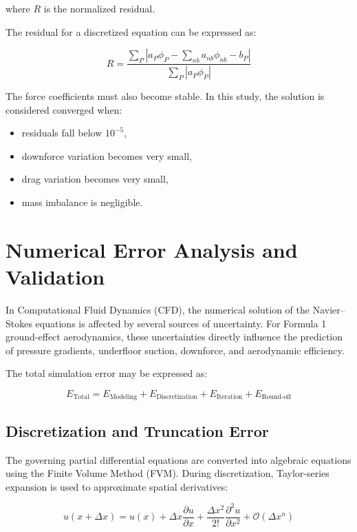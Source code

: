 \documentclass[12pt,a4paper]{article}
\begin{document}
where \(R\) is the normalized residual.

The residual for a discretized equation can be expressed as:

\begin{equation}
    R =\frac{\sum_P\left|a_P\phi_P - \sum_{nb}a_{nb}\phi_{nb} - b_P\right|}{\sum_P\left|a_P\phi_P\right|}
\end{equation}

The force coefficients must also become stable. In this study, the solution is considered converged when:

\begin{itemize}
    \item residuals fall below \(10^{-5}\),
    \item downforce variation becomes very small,
    \item drag variation becomes very small,
    \item mass imbalance is negligible.
\end{itemize}

\section{Numerical Error Analysis and Validation}

In Computational Fluid Dynamics (CFD), the numerical solution of the Navier--Stokes
equations is affected by several sources of uncertainty. For Formula 1 ground-effect
aerodynamics, these uncertainties directly influence the prediction of pressure gradients,
underfloor suction, downforce, and aerodynamic efficiency.

The total simulation error may be expressed as:

\begin{equation}
    E_{\text{Total}}
    =
    E_{\text{Modeling}}
    +
    E_{\text{Discretization}}
    +
    E_{\text{Iteration}}
    +
    E_{\text{Round-off}}
\end{equation}

\subsection{Discretization and Truncation Error}

The governing partial differential equations are converted into algebraic equations using
the Finite Volume Method (FVM). During discretization, Taylor-series expansion is used
to approximate spatial derivatives:

\begin{equation}
    u(x+\Delta x)
    =
    u(x)
    +
    \Delta x \frac{\partial u}{\partial x}
    +
    \frac{\Delta x^2}{2!}
    \frac{\partial^2 u}{\partial x^2}
    +
    \mathcal{O}(\Delta x^n)
\end{equation}
\end{document}
